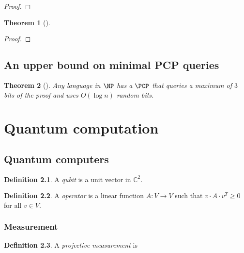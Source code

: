 \documentclass[english,12pt]{reedthesis}
\theoremstyle{plain}
\newtheorem{thm}{Theorem}[section]
\theoremstyle{definition}
\newtheorem{defn}[defn]{Definition}
\theoremstyle{remark}
\begin{document}
\begin{proof}
\end{proof}

\begin{thm}[{\cite[Prop.\ 2.14]{BGHSV06}}]\label{thm:parallel-vs-robust}
\end{thm}

\begin{proof}
\end{proof}

\section{An upper bound on minimal PCP queries}\label{sec:pcp-query-complexity}

\begin{thm}[{\cite{Has97}}]\label{thm:pcp-max-queries}
  Any language in $\NP$ has a $\PCP$ that queries a maximum of $3$ bits of the
  proof and uses $O(\log n)$ random bits.
\end{thm}

\chapter{Quantum computation}\label{chap:quantum}

\section{Quantum computers}\label{sec:quant-comp}

\begin{defn}\label{def:qubit}
  A \emph{qubit} is a unit vector in $\mathbb{C}^{2}$.
\end{defn}

\begin{defn}\label{def:operator}
  A \emph{operator} is a linear function $A\colon V \rightarrow V$ such that
  $v \cdot A \cdot v^{T} \ge 0$ for all $v \in V$.
\end{defn}

\subsection{Measurement}

\begin{defn}\label{def:projective-measure}
  A \emph{projective measurement} is
\end{defn}
\end{document}
